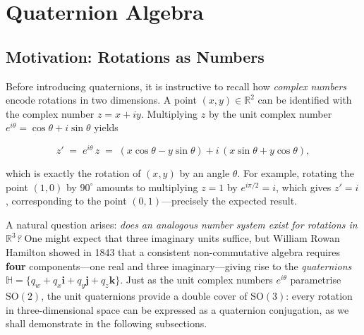 \section{Quaternion Algebra}
\label{sec:quaternions}


\subsection{Motivation: Rotations as Numbers}
\label{sec:quat:motivation}

Before introducing quaternions, it is instructive to recall how
\emph{complex numbers} encode rotations in two dimensions.  A point
$(x,y)\in\mathbb{R}^2$ can be identified with the complex number
$z = x + iy$.  Multiplying $z$ by the unit complex number
$e^{i\theta} = \cos\theta + i\sin\theta$ yields

\begin{equation}
  z' \;=\; e^{i\theta}\,z
     \;=\; (x\cos\theta - y\sin\theta)
          + i\,(x\sin\theta + y\cos\theta),
  \label{eq:complex_rotation}
\end{equation}

\noindent which is exactly the rotation of $(x,y)$ by an angle $\theta$.
For example, rotating the point $(1,0)$ by $90^\circ$ amounts to multiplying
$z=1$ by $e^{i\pi/2} = i$, which gives $z'= i$, corresponding to the
point $(0,1)$---precisely the expected result.

A natural question arises: \emph{does an analogous number system exist
for rotations in $\mathbb{R}^3$?}  One might expect that three imaginary
units suffice, but William Rowan Hamilton showed in 1843 that a consistent
non-commutative algebra requires \textbf{four} components---one real and
three imaginary---giving rise to the \emph{quaternions}
$\mathbb{H} = \{q_w + q_x\mathbf{i} + q_y\mathbf{j} + q_z\mathbf{k}\}$.
Just as the unit complex numbers $e^{i\theta}$ parametrise $\mathrm{SO}(2)$,
the unit quaternions provide a double cover of $\mathrm{SO}(3)$: every
rotation in three-dimensional space can be expressed as a quaternion
conjugation, as we shall demonstrate in the following subsections.

